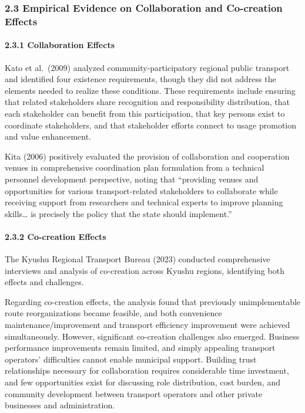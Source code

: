 \subsubsection{2.3 Empirical Evidence on Collaboration and Co-creation
Effects}\label{empirical-evidence-on-collaboration-and-co-creation-effects}

\paragraph{2.3.1 Collaboration Effects}\label{collaboration-effects}

Kato et al.~(2009) analyzed community-participatory regional public
transport and identified four existence requirements, though they did
not address the elements needed to realize these conditions. These
requirements include ensuring that related stakeholders share
recognition and responsibility distribution, that each stakeholder can
benefit from this participation, that key persons exist to coordinate
stakeholders, and that stakeholder efforts connect to usage promotion
and value enhancement.

Kita (2006) positively evaluated the provision of collaboration and
cooperation venues in comprehensive coordination plan formulation from a
technical personnel development perspective, noting that ``providing
venues and opportunities for various transport-related stakeholders to
collaborate while receiving support from researchers and technical
experts to improve planning skills\ldots{} is precisely the policy that
the state should implement.''

\paragraph{2.3.2 Co-creation Effects}\label{co-creation-effects}

The Kyushu Regional Transport Bureau (2023) conducted comprehensive
interviews and analysis of co-creation across Kyushu regions,
identifying both effects and challenges.

Regarding co-creation effects, the analysis found that previously
unimplementable route reorganizations became feasible, and both
convenience maintenance/improvement and transport efficiency improvement
were achieved simultaneously. However, significant co-creation
challenges also emerged. Business performance improvements remain
limited, and simply appealing transport operators' difficulties cannot
enable municipal support. Building trust relationships necessary for
collaboration requires considerable time investment, and few
opportunities exist for discussing role distribution, cost burden, and
community development between transport operators and other private
businesses and administration.


